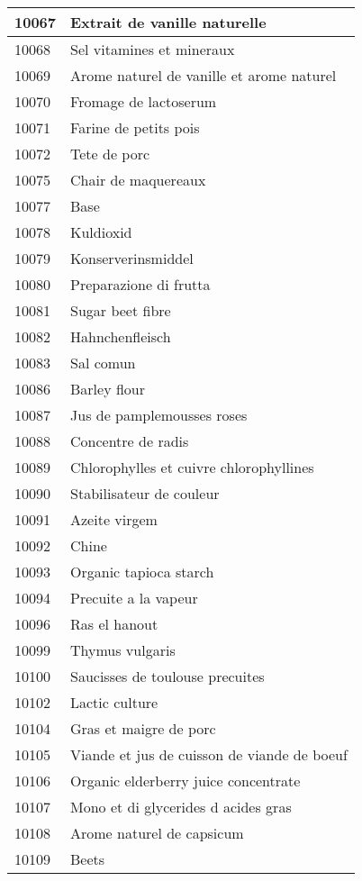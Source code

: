 \begin{longtable}{|l|l|}
10067 & Extrait de vanille naturelle \\ \hline 
10068 & Sel vitamines et mineraux \\ \hline 
10069 & Arome naturel de vanille et arome naturel \\ \hline 
10070 & Fromage de lactoserum \\ \hline 
10071 & Farine de petits pois \\ \hline 
10072 & Tete de porc \\ \hline 
10075 & Chair de maquereaux \\ \hline 
10077 & Base \\ \hline 
10078 & Kuldioxid \\ \hline 
10079 & Konserverinsmiddel \\ \hline 
10080 & Preparazione di frutta \\ \hline 
10081 & Sugar beet fibre \\ \hline 
10082 & Hahnchenfleisch \\ \hline 
10083 & Sal comun \\ \hline 
10086 & Barley flour \\ \hline 
10087 & Jus de pamplemousses roses \\ \hline 
10088 & Concentre de radis \\ \hline 
10089 & Chlorophylles et cuivre chlorophyllines \\ \hline 
10090 & Stabilisateur de couleur \\ \hline 
10091 & Azeite virgem \\ \hline 
10092 & Chine \\ \hline 
10093 & Organic tapioca starch \\ \hline 
10094 & Precuite a la vapeur \\ \hline 
10096 & Ras el hanout \\ \hline 
10099 & Thymus vulgaris \\ \hline 
10100 & Saucisses de toulouse precuites \\ \hline 
10102 & Lactic culture \\ \hline 
10104 & Gras et maigre de porc \\ \hline 
10105 & Viande et jus de cuisson de viande de boeuf \\ \hline 
10106 & Organic elderberry juice concentrate \\ \hline 
10107 & Mono et di glycerides d acides gras \\ \hline 
10108 & Arome naturel de capsicum \\ \hline 
10109 & Beets \\ \hline 

\end{longtable}
